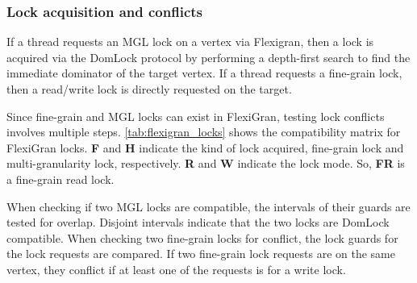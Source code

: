 \subsubsection{Lock acquisition and conflicts}

If a thread requests an MGL lock on a vertex via Flexigran, then a lock is acquired via the DomLock protocol by performing a depth-first search to find the immediate dominator of the target vertex.
If a thread requests a fine-grain lock, then a read/write lock is directly requested on the target. 

Since fine-grain and MGL locks can exist in FlexiGran, testing lock conflicts involves multiple steps. \cref{tab:flexigran_locks} shows the compatibility matrix for FlexiGran locks. \textbf{F} and \textbf{H} indicate the kind of lock acquired, fine-grain lock and multi-granularity lock, respectively. \textbf{R} and \textbf{W} indicate the lock mode. So, \textbf{FR} is a fine-grain read lock.

When checking if two MGL locks are compatible, the intervals of their guards are tested for overlap. Disjoint intervals indicate that the two locks are DomLock compatible. When checking two fine-grain locks for conflict, the lock guards for the lock requests are compared. 
If two fine-grain lock requests are on the same vertex, they conflict if at least one of the requests is for a write lock.


